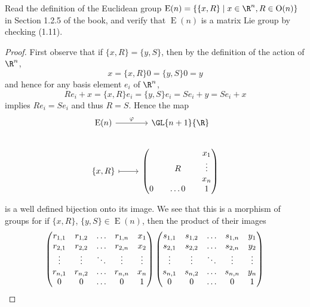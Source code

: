 \documentclass[10pt]{amsart}
\begin{document}
\begin{ex}
  Read the definition of the Euclidean group $\operatorname{E}(n) = \left\{\{x,R\} \;\middle\vert\; x \in \R^n, R \in \operatorname{O}(n)\right\}$ in Section 1.2.5 of the book, and verify that $\operatorname{E}(n)$ is a matrix Lie group by checking (1.11).
  \begin{proof}
    First observe that if $\{x,R\} = \{y, S\}$, then by the definition of the action of $\R^n$,
    $$x = \{x,R\}0 = \{y,S\}0 = y$$
    and hence for any basis element $e_i$ of $\R^n$,
    $$Re_i + x = \{x,R\}e_i = \{y,S\}e_i = Se_i + y = Se_i + x$$
    implies $Re_i = Se_i$ and thus $R = S$.
    Hence the map
    $$\begin{tikzcd}
      \operatorname{E}(n) \arrow{r}{\varphi} & \GL{n+1}{\R}\\
      \{x,R\} \arrow[mapsto]{r} & \left(
      \begin{matrix}
        &   & x_1\\
        & R & \vdots\\
        &   & x_n\\
        0 & \ldots 0 & 1
      \end{matrix}
      \right)
    \end{tikzcd}$$
    is a well defined bijection onto its image.
    We see that this is a morphism of groups for if $\{x,R\}$, $\{y,S\} \in \operatorname{E}(n)$, then the product of their images
    $$
      \left(
      \begin{matrix}
        r_{1,1} & r_{1,2} & \ldots & r_{1,n} & x_1\\
        r_{2,1} & r_{2,2} & \ldots & r_{2,n} & x_2\\
        \vdots & \vdots & \ddots & \vdots & \vdots\\
        r_{n,1} & r_{n,2} & \ldots & r_{n,n} & x_n\\
        0 & 0 & \ldots & 0 & 1
      \end{matrix}
      \right)
      \left(
      \begin{matrix}
        s_{1,1} & s_{1,2} & \ldots & s_{1,n} & y_1\\
        s_{2,1} & s_{2,2} & \ldots & s_{2,n} & y_2\\
        \vdots & \vdots & \ddots & \vdots & \vdots\\
        s_{n,1} & s_{n,2} & \ldots & s_{n,n} & y_n\\
        0 & 0 & \ldots & 0 & 1
      \end{matrix}
      \right)\\
$$
\end{proof}
\end{ex}
\end{document}
